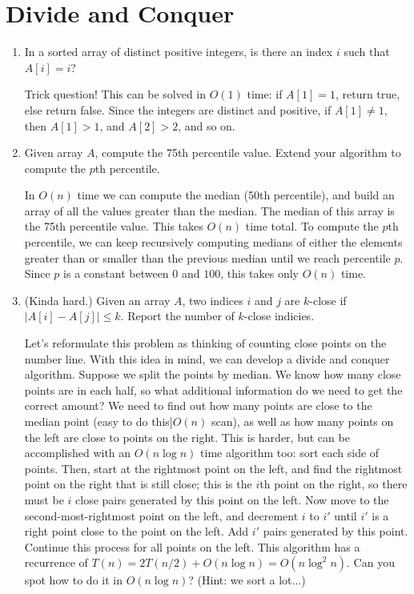 \documentclass[fleqn]{article}
\begin{document}
\section{Divide and Conquer}
\begin{enumerate}
    \item In a sorted array of distinct positive integers, is there an index $i$ such that $A[i] = i$?
    \begin{answer}
        Trick question! This can be solved in $O(1)$ time: if $A[1] = 1$, return true, else return false. Since the integers are distinct and positive, if $A[1] \neq 1$, then $A[1] > 1$, and $A[2] > 2$, and so on.
    \end{answer}
    \item Given array $A$, compute the 75th percentile value. Extend your algorithm to compute the $p$th percentile.
    \begin{answer}
        In $O(n)$ time we can compute the median (50th percentile), and build an array of all the values greater than the median. The median of this array is the 75th percentile value. This takes $O(n)$ time total. To compute the $p$th percentile, we can keep recursively computing medians of either the elements greater than or smaller than the previous median until we reach percentile $p$. Since $p$ is a constant between $0$ and $100$, this takes only $O(n)$ time.
    \end{answer}
    \item (Kinda hard.) Given an array $A$, two indices $i$ and $j$ are $k$-close if $|A[i] - A[j]| \leq k$. Report the number of $k$-close indicies.
    \begin{answer}
        Let's reformulate this problem as thinking of counting close points on the number line. With this idea in mind, we can develop a divide and conquer algorithm. Suppose we split the points by median. We know how many close points are in each half, so what additional information do we need to get the correct amount? We need to find out how many points are close to the median point (easy to do this|$O(n)$ scan), as well as how many points on the left are close to points on the right. This is harder, but can be accomplished with an $O(n\log n)$ time algorithm too: sort each side of points. Then, start at the rightmost point on the left, and find the rightmost point on the right that is still close; this is the $i$th point on the right, so there must be $i$ close pairs generated by this point on the left. Now move to the second-most-rightmost point on the left, and decrement $i$ to $i'$ until $i'$ is a right point close to the point on the left. Add $i'$ pairs generated by this point. Continue this process for all points on the left. This algorithm has a recurrence of $T(n) = 2T(n/2) + O(n\log n) = O(n\log^2 n)$. Can you spot how to do it in $O(n\log n)$? (Hint: we sort a lot...)
    \end{answer}
\end{enumerate}
\end{document}
